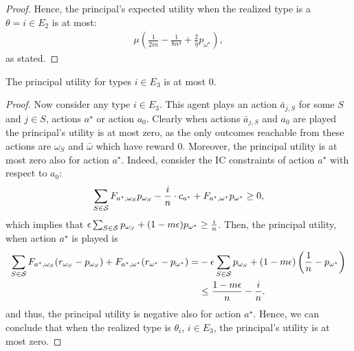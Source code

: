 \begin{proof}
	
	
	Hence, the principal's expected utility when the realized type is a $\theta=i \in E_2$ is at most:
	\begin{align*}\label{eq:boundE2}
	\mu\left(\frac{1}{2in}-\frac{1}{8n^4}+\frac{2}{\eta}p_{\omega^\star}\right),
	\end{align*}
    as stated.    
\end{proof}

\begin{lemma}\label{lem:onlyif3}
   The principal utility for types $i\in E_3$ is at most $0$.
\end{lemma}

\begin{proof}
    	Now consider any type $i\in E_3$. This agent plays an action $\bar a_{j, S}$ for some $S$ and $j\in S$, actions $a^\star$ or action $a_0$.
	Clearly when actions $\bar a_{j, S}$ and $a_0$ are played the principal's utility is at most zero, as the only outcomes reachable from these actions are $\omega_S$ and $\bar\omega$ which have reward $0$. Moreover, the principal utility is at most zero also for action $a^\star$. Indeed, consider the IC constraints of action $a^\star$ with respect to $a_0$:
	\[
	\sum_{S\in\mathcal{S}}F_{a^\star,\omega_S}p_{\omega_S}-\frac{i}{n} \cdot c_{a^\star} + F_{a^\star,\omega^\star} p_{\omega^\star}\ge 0,
	\]
	which implies that $\epsilon\sum_{S\in\mathcal{S}}p_{\omega_S}+(1-m\epsilon)p_{\omega^\star}\ge \frac{i}{n}$. Then, the principal utility, when action $a^\star$ is played is 
	\begin{align*}
		\sum_{S\in\mathcal{S}} F_{a^\star,\omega_S}(r_{\omega_S}-p_{\omega_S})+F_{a^\star,\omega^\star}(r_{\omega^\star}-p_{\omega^\star})=&-\epsilon\sum_{S\in\mathcal{S}}p_{\omega_S}+(1-m\epsilon)\left(\frac{1}{n}-p_{\omega^\star}\right)\\
		&\le \frac{1-m\epsilon}{n}- \frac{i}{n}.
	\end{align*}
	and thus, the principal utility is negative also for action $a^\star$.
    Hence, we can conclude that when the realized type is $\theta_i$, $i\in E_3$, the principal's utility is at most zero.
\end{proof}


